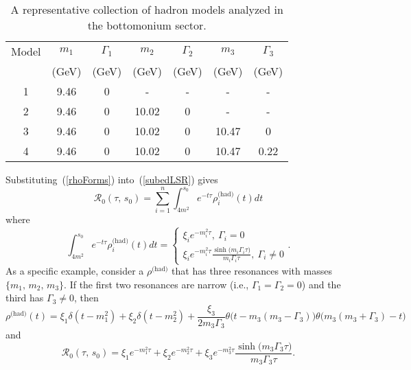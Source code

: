 \documentclass[11pt, letterpaper]{article}
\newcommand{\lsr}{\mathcal{R}_{0}}
\newcommand{\double}[2]{(#1,\,#2)}
\newcommand{\dif}[1]{d #1}
\begin{document}
\begin{table}
\centering
\caption{A representative collection of hadron models analyzed in the bottomonium sector.}
\label{bottomoniumModels}
\begin{tabular}{ccccccc}
  \addlinespace
  \toprule
  Model & $m_1$ & $\Gamma_1$ & $m_2$ & $\Gamma_2$ & $m_3$ & $\Gamma_3$\\
   & (GeV) & (GeV) & (GeV) & (GeV) & (GeV) & (GeV)\\ 
  \midrule
  1 & 9.46 & 0 & - & - & - & - \\
  2 & 9.46 & 0 & 10.02 & 0  & - & - \\
  3 & 9.46 & 0 & 10.02 & 0 & 10.47 & 0 \\
  4 & 9.46 & 0 & 10.02 & 0 & 10.47 & 0.22 \\
  \bottomrule
\end{tabular}
\end{table}

Substituting~(\ref{rhoForms}) into~(\ref{subedLSR}) gives
%
\begin{equation}\label{lsrFinal}
  \lsr\double{\tau}{s_0}=\sum_{i=1}^n \int_{4m^2}^{s_0} e^{-t\tau}
  \rho^{\text{(had)}}_i(t)\dif{t}
\end{equation}
%
where
%
\begin{equation}\label{specific_rho}
  \int_{4m^2}^{s_0} e^{-t\tau}\rho^{\text{(had)}}_i(t) dt =
  \begin{cases}
    \xi_i e^{-m_i^2 \tau},\ \Gamma_i=0\\
    \xi_i e^{-m_i^2 \tau}\frac{\sinh\big(m_i \Gamma_i\tau\big)}{m_i\Gamma_i\tau},\ 
      \Gamma_i\neq0
  \end{cases}.
\end{equation}
%
As a specific example, consider a $\rho^{\text{(had)}}$ that has three resonances
with masses $\{m_1,\,m_2,\,m_3\}$.  If the first two resonances are narrow
(i.e., $\Gamma_1=\Gamma_2=0$)
and the third has $\Gamma_3\neq0$, then
%
\begin{equation}\label{specific_rho2}
  \rho^{\text{(had)}}(t) = \xi_1 \delta(t-m_1^2)+\xi_2 \delta(t-m_2^2)
  +\frac{\xi_3}{2m_3 \Gamma_3}
  \theta\big(t-m_3(m_3-\Gamma_3)\big)\theta\big(m_3(m_3+\Gamma_3)-t\big)
\end{equation}
%
and
%
\begin{equation}
  \lsr\double{\tau}{s_0} = 
    \xi_1 e^{-m_1^2 \tau}
    + \xi_2 e^{-m_2^2 \tau}
    + \xi_3 e^{-m_3^2 \tau}\frac{\sinh\big(m_3\Gamma_3\tau\big)}{m_3\Gamma_3\tau}.
\end{equation}
\end{document}
